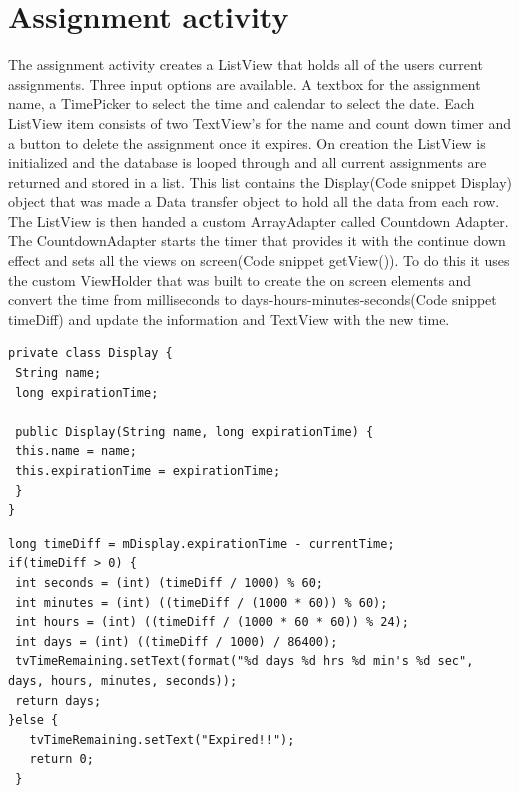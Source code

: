 \clearpage
\section{Assignment activity}
The assignment activity creates a ListView that holds all of the users current assignments. Three input options are available. A textbox for the assignment name, a TimePicker to select the time and calendar to select the date. Each ListView item consists of two TextView's for the name and count down timer and a button to delete the assignment once it expires. On creation the ListView is initialized and the database is looped through and all current assignments are returned and stored in a list. This list contains the Display(Code snippet Display) object that was made a Data transfer object to hold all the data from each row. The ListView is then handed a custom ArrayAdapter called Countdown Adapter. The CountdownAdapter starts the timer that provides it with the continue down effect and sets all the views on screen(Code snippet getView()). To do this it uses the custom ViewHolder that was built to create the on screen elements and convert the time from milliseconds to days-hours-minutes-seconds(Code snippet timeDiff) and update the information and TextView with the new time.

\begin{verbatim}
private class Display {
 String name;
 long expirationTime;

 public Display(String name, long expirationTime) {
 this.name = name;
 this.expirationTime = expirationTime;
 }
}
\end{verbatim}

\begin{verbatim}
long timeDiff = mDisplay.expirationTime - currentTime;
if(timeDiff > 0) {
 int seconds = (int) (timeDiff / 1000) % 60;
 int minutes = (int) ((timeDiff / (1000 * 60)) % 60);
 int hours = (int) ((timeDiff / (1000 * 60 * 60)) % 24);
 int days = (int) ((timeDiff / 1000) / 86400);
 tvTimeRemaining.setText(format("%d days %d hrs %d min's %d sec", days, hours, minutes, seconds));
 return days;
}else {
   tvTimeRemaining.setText("Expired!!");
   return 0;
 }
\end{verbatim}

